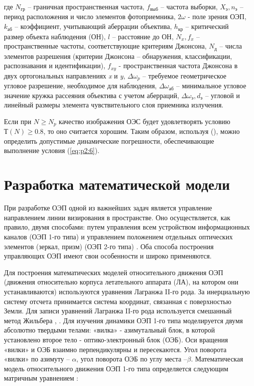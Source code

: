 где 
$N_{\textit{гр}}$ – граничная пространственная частота, 
$f_{\textit{выб}}$ – частота выборки, 
$X_{\textit{э}} ,n_{\textit{э}}$ –период расположения и число элементов фотоприемника, 
$2\omega$ - поле зрения ОЭП, 
$k_{\textit{аб}}$ – коэффициент, учитывающий аберрации объектива, 
$h_{\textit{кр}}$ – критический размер объекта наблюдения (ОН), 
$l$ – расстояние до ОН, 
$N_{x} , f_{x}$ – пространственные частоты, соответствующие критериям Джонсона, 
$N_{\textit{д}}$ – числа элементов разрешения (критерии Джонсона – обнаружения, классификации, распознавания и идентификации), 
$f_{xy}$ - пространственная частота Джонсона в двух ортогональных направлениях \textit{x} и \textit{y}, 
$\Delta{}{\omega{}}_p$ – требуемое геометрическое угловое разрешение, необходимое для наблюдения, 
$\Delta{}{\omega{}}_{\textit{аб}}$ – минимальное угловое значение кружка рассеяния объектива с учетом аберраций, 
$\Delta{}{\omega{}}_{\textit{э}} , d_{\textit{э}}$ – угловой и линейный размеры элемента чувствительного слоя приемника излучения. 

Если при $N \ge N_p$ качество изображения ОЭС будет удовлетворять условию $Т(N) \ge 0.8$, то оно считается хорошим. Таким образом, используя (), можно определить допустимые динамические погрешности, обеспечивающие выполнение условия (\ref{eq:p2:6}).

\section{Разработка математической модели} \label{sec:ch2/sec3}

При разработке ОЭП одной из важнейших задач является управление направлением линии визирования в пространстве. Оно осуществляется, как правило, двумя способами: путем управления всем устройством информационных каналов (ОЭП 1-го типа) и управлением положением отдельных оптических элементов (зеркал, призм) (ОЭП 2-го типа) \cite[]{Karpov23}. Оба способа построения управляющих ОЭП имеют свои особенности и широко применяются.

Для построения математических моделей относительного движения ОЭП (движения относительно корпуса летательного аппарата (ЛА), на котором они устанавливаются) используются уравнения Лагранжа II-го рода. За инерциальную систему отсчета принимается система координат, связанная с поверхностью Земли. Для записи уравнений Лагранжа II-го рода используется смешанный метод Жильбера \cite[]{Belyakov}, \cite[]{Baloev16}. Для изучения динамики ОЭП 1-го типа моделируется двумя абсолютно твердыми телами: «вилка» - азимутальный блок, в которой установлено второе тело - оптико-электронный блок (ОЭБ). Оси вращения «вилки» и ОЭБ взаимно перпендикулярны и пересекаются. Угол поворота «вилки» по азимуту – $\alpha$, угол поворота ОЭБ по углу места –$\beta$. Математическая модель относительного движения ОЭП 1-го типа определяется следующим матричным уравнением \cite[]{Karpov23}:

